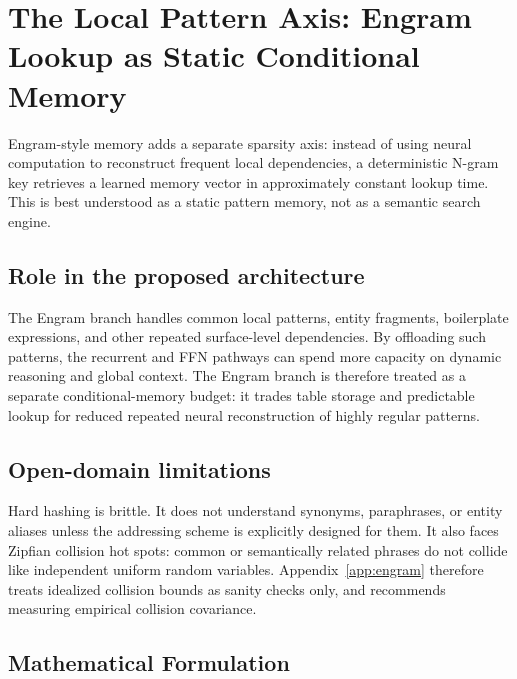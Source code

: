 \documentclass[11pt]{article}
\begin{document}
\section{The Local Pattern Axis: Engram Lookup as Static Conditional Memory}

Engram-style memory adds a separate sparsity axis: instead of using neural computation to reconstruct frequent local dependencies, a deterministic N-gram key retrieves a learned memory vector in approximately constant lookup time. This is best understood as a static pattern memory, not as a semantic search engine.

\subsection{Role in the proposed architecture}

The Engram branch handles common local patterns, entity fragments, boilerplate expressions, and other repeated surface-level dependencies. By offloading such patterns, the recurrent and FFN pathways can spend more capacity on dynamic reasoning and global context. The Engram branch is therefore treated as a separate conditional-memory budget: it trades table storage and predictable lookup for reduced repeated neural reconstruction of highly regular patterns.

\subsection{Open-domain limitations}

Hard hashing is brittle. It does not understand synonyms, paraphrases, or entity aliases unless the addressing scheme is explicitly designed for them. It also faces Zipfian collision hot spots: common or semantically related phrases do not collide like independent uniform random variables. Appendix~\ref{app:engram} therefore treats idealized collision bounds as sanity checks only, and recommends measuring empirical collision covariance.

\subsection{Mathematical Formulation}
\end{document}
